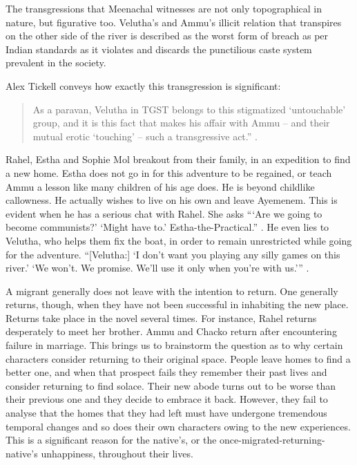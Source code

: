 The transgressions that Meenachal witnesses are not only topographical in nature, but figurative too. Velutha's and Ammu's illicit relation that transpires on the other side of the river is described as the worst form of breach as per Indian standards as it violates and discards the punctilious caste system prevalent in the society. 

Alex Tickell conveys how exactly this transgression is significant:

\begin{quote}
  As a paravan, Velutha in TGST belongs to this stigmatized `untouchable' group, and it is this fact that makes his affair with Ammu – and their mutual erotic `touching' – such a transgressive act.'' \parencite[23]{Tickell2007}. 
\end{quote}

Rahel, Estha and Sophie Mol breakout from their family, in an expedition to find a new home. Estha does not go in for this adventure to be regained, or teach Ammu a lesson like many children of his age does. He is beyond childlike callowness. He actually wishes to live on his own and leave Ayemenem. This is evident when he has a serious chat with Rahel. She asks ```Are we going to become communists?' `Might have to.' Estha-the-Practical.'' \parencite[200]{Roy1997}. He even lies to Velutha, who helps them fix the boat, in order to remain unrestricted while going for the adventure. ``[Velutha:] `I don't want you playing any silly games on this river.' `We won't. We promise. We'll use it only when you're with us.''' \parencite[213]{Roy1997}. 

A migrant generally does not leave with the intention to return. One generally returns, though, when they have not been successful in inhabiting the new place. Returns take place in the novel several times. For instance, Rahel returns desperately to meet her brother. Ammu and Chacko return after encountering failure in marriage. This brings us to brainstorm the question as to why certain characters consider returning to their original space. People leave homes to find a better one, and when that prospect fails they remember their past lives and consider returning to find solace. Their new abode turns out to be worse than their previous one and they decide to embrace it back. However, they fail to analyse that the homes that they had left must have undergone tremendous temporal changes and so does their own characters owing to the new experiences. This is a significant reason for the native's, or the once-migrated-returning-native's unhappiness, throughout their lives. 

